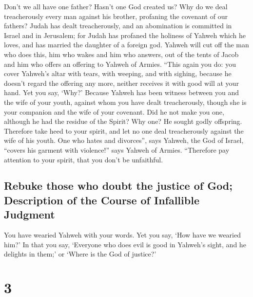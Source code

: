  Don't we all have one father? Hasn't one God created us?
Why do we deal treacherously every man against his brother, profaning
the covenant of our fathers?  Judah has dealt
treacherously, and an abomination is committed in Israel and in
Jerusalem; for Judah has profaned the holiness of Yahweh which he loves,
and has married the daughter of a foreign god.  Yahweh
will cut off the man who does this, him who wakes and him who answers,
out of the tents of Jacob and him who offers an offering to Yahweh of
Armies.  ``This again you do: you cover Yahweh's altar
with tears, with weeping, and with sighing, because he doesn't regard
the offering any more, neither receives it with good will at your hand.
 Yet you say, `Why?' Because Yahweh has been witness
between you and the wife of your youth, against whom you have dealt
treacherously, though she is your companion and the wife of your
covenant.  Did he not make you one, although he had the
residue of the Spirit? Why one? He sought godly offspring. Therefore
take heed to your spirit, and let no one deal treacherously against the
wife of his youth.  One who hates and divorces'', says
Yahweh, the God of Israel, ``covers his garment with violence!'' says
Yahweh of Armies. ``Therefore pay attention to your spirit, that you
don't be unfaithful.

\hypertarget{rebuke-those-who-doubt-the-justice-of-god-description-of-the-course-of-infallible-judgment}{%
\subsection{Rebuke those who doubt the justice of God; Description of
the Course of Infallible
Judgment}\label{rebuke-those-who-doubt-the-justice-of-god-description-of-the-course-of-infallible-judgment}}

 You have wearied Yahweh with your words. Yet you say,
`How have we wearied him?' In that you say, `Everyone who does evil is
good in Yahweh's sight, and he delights in them;' or `Where is the God
of justice?'

\hypertarget{section-2}{%
\section{3}\label{section-2}}

